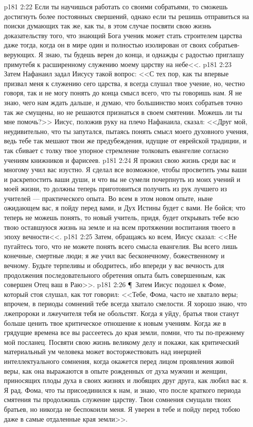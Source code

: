 \vs p181 2:22 Если ты научишься работать со своими собратьями, то сможешь достигнуть более постоянных свершений, однако если ты решишь отправиться на поиски думающих так же, как ты, в этом случае посвяти свою жизнь доказательству того, что знающий Бога ученик может стать строителем царства даже тогда, когда он в мире один и полностью изолирован от своих собратьев\hyp{}верующих. Я знаю, ты будешь верен до конца, и однажды с радостью приглашу примутебя к расширенному служению моему царству на небе<<.
\vs p181 2:23 Затем Нафанаил задал Иисусу такой вопрос: <<С тех пор, как ты впервые призвал меня к служению сего царства, я всегда слушал твое учение, но, честно говоря, так и не могу понять до конца смысл всего, что ты говоришь нам. Я не знаю, чего нам ждать дальше, и думаю, что большинство моих собратьев точно так же смущены, но не решаются признаться в своем смятении. Можешь ли ты мне помочь?>> Иисус, положив руку на плечо Нафанаила, сказал: <<Друг мой, неудивительно, что ты запутался, пытаясь понять смысл моего духовного учения, ведь тебе так мешают твои же предубеждения, идущие от еврейской традиции, и так сбивает с толку твое упорное стремление толковать евангелие согласно учениям книжников и фарисеев.
\vs p181 2:24 Я прожил свою жизнь среди вас и многому учил вас изустно. Я сделал все возможное, чтобы просветить умы ваши и раскрепостить ваши души, и что вы не сумели почерпнуть из моих учений и моей жизни, то должны теперь приготовиться получить из рук лучшего из учителей --- практического опыта. Во всем в этом новом опыте, ныне ожидающем вас, я пойду перед вами, и Дух Истины будет с вами. Не бойся; что теперь не можешь понять, то новый учитель, придя, будет открывать тебе всю твою оставшуюся жизнь на земле и на всем протяжении воспитания твоего в эпоху вечности<<.
\vs p181 2:25 Затем, обращаясь ко всем, Иисус сказал: <<Не пугайтесь того, что не можете понять всего смысла евангелия. Вы всего лишь конечные, смертные люди; я же учил вас бесконечному, божественному и вечному. Будьте терпеливы и ободритесь, ибо впереди у вас вечность для продолжения последовательного обретения опыта быть совершенным, как совершен Отец ваш в Раю>>.
\vs p181 2:26 \P\ Затем Иисус подошел к Фоме, который стоя слушал, как тот говорил: <<Тебе, Фома, часто не хватало веры; впрочем, в периоды сомнений тебе всегда хватало смелости. Я хорошо знаю, что лжепророки и лжеучителя тебя не обольстят. Когда я уйду, братья твои станут больше ценить твое критическое отношение к новым учениям. Когда же в грядущие времена все вы рассеетесь до края земли, помни, что ты по\hyp{}прежнему мой посланец. Посвяти свою жизнь великому делу и покажи, как критический материальный ум человека может восторжествовать над инерцией интеллектуального сомнения, когда окажется перед лицом проявления живой веры, как она выражаются в опыте рожденных от духа мужчин и женщин, приносящих плоды духа в своих жизнях и любящих друг друга, как любил вас я. Я рад, Фома, что ты присоединился к нам, и знаю, что после краткого периода смятения ты продолжишь служение царству. Твои сомнения смущали твоих братьев, но никогда не беспокоили меня. Я уверен в тебе и пойду перед тобою даже в самые отдаленные края земли>>.
